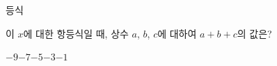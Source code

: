 등식\par\smallskip{}\par\smallskip\noindent 이 $x$에 대한 항등식일 때, 상수 $a$, $b$, $c$에 대하여 $a+b+c$의 값은?
\begin{choices32}{$-9$}{$-7$}{$-5$}{$-3$}{$-1$}\end{choices32}
